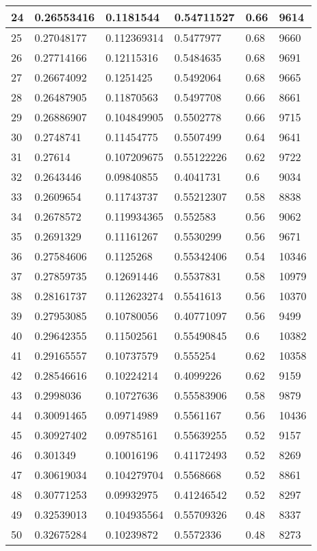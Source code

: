 \begin{longtable}{|l|l|l|l|l|l|}
24 & 0.26553416 & 0.1181544 & 0.54711527 & 0.66 & 9614 \\ \hline 
25 & 0.27048177 & 0.112369314 & 0.5477977 & 0.68 & 9660 \\ \hline 
26 & 0.27714166 & 0.12115316 & 0.5484635 & 0.68 & 9691 \\ \hline 
27 & 0.26674092 & 0.1251425 & 0.5492064 & 0.68 & 9665 \\ \hline 
28 & 0.26487905 & 0.11870563 & 0.5497708 & 0.66 & 8661 \\ \hline 
29 & 0.26886907 & 0.104849905 & 0.5502778 & 0.66 & 9715 \\ \hline 
30 & 0.2748741 & 0.11454775 & 0.5507499 & 0.64 & 9641 \\ \hline 
31 & 0.27614 & 0.107209675 & 0.55122226 & 0.62 & 9722 \\ \hline 
32 & 0.2643446 & 0.09840855 & 0.4041731 & 0.6 & 9034 \\ \hline 
33 & 0.2609654 & 0.11743737 & 0.55212307 & 0.58 & 8838 \\ \hline 
34 & 0.2678572 & 0.119934365 & 0.552583 & 0.56 & 9062 \\ \hline 
35 & 0.2691329 & 0.11161267 & 0.5530299 & 0.56 & 9671 \\ \hline 
36 & 0.27584606 & 0.1125268 & 0.55342406 & 0.54 & 10346 \\ \hline 
37 & 0.27859735 & 0.12691446 & 0.5537831 & 0.58 & 10979 \\ \hline 
38 & 0.28161737 & 0.112623274 & 0.5541613 & 0.56 & 10370 \\ \hline 
39 & 0.27953085 & 0.10780056 & 0.40771097 & 0.56 & 9499 \\ \hline 
40 & 0.29642355 & 0.11502561 & 0.55490845 & 0.6 & 10382 \\ \hline 
41 & 0.29165557 & 0.10737579 & 0.555254 & 0.62 & 10358 \\ \hline 
42 & 0.28546616 & 0.10224214 & 0.4099226 & 0.62 & 9159 \\ \hline 
43 & 0.2998036 & 0.10727636 & 0.55583906 & 0.58 & 9879 \\ \hline 
44 & 0.30091465 & 0.09714989 & 0.5561167 & 0.56 & 10436 \\ \hline 
45 & 0.30927402 & 0.09785161 & 0.55639255 & 0.52 & 9157 \\ \hline 
46 & 0.301349 & 0.10016196 & 0.41172493 & 0.52 & 8269 \\ \hline 
47 & 0.30619034 & 0.104279704 & 0.5568668 & 0.52 & 8861 \\ \hline 
48 & 0.30771253 & 0.09932975 & 0.41246542 & 0.52 & 8297 \\ \hline 
49 & 0.32539013 & 0.104935564 & 0.55709326 & 0.48 & 8337 \\ \hline 
50 & 0.32675284 & 0.10239872 & 0.5572336 & 0.48 & 8273 \\ \hline 
\end{longtable}